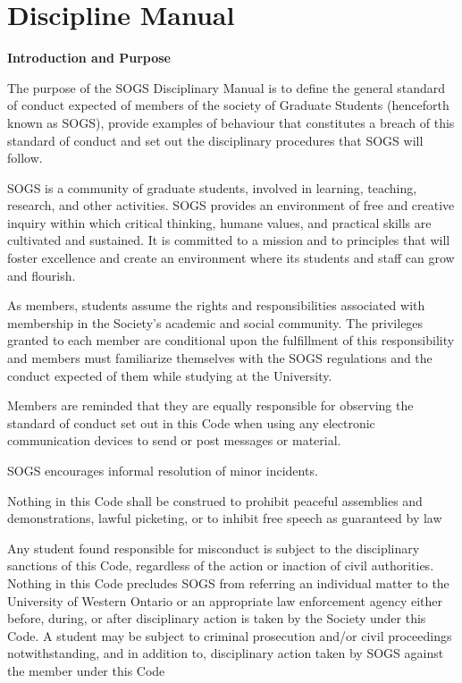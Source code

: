 \section{Discipline Manual}

\begin{longenum}[ label*=\arabic*., align=left]
\item  \textbf{Introduction and Purpose}
\begin{longenum}[ label*=\arabic*., align=left]     
\item  The  purpose  of  the  SOGS  Disciplinary  Manual  is  to  define  the  general  standard  of  conduct expected of members of the society of Graduate Students (henceforth known as SOGS), provide examples  of  behaviour  that  constitutes  a  breach  of  this  standard  of  conduct  and  set  out  the disciplinary procedures that SOGS will follow.
     \item SOGS is a community of graduate students, involved in learning, teaching, research, and other activities.  SOGS provides  an  environment  of  free  and  creative  inquiry  within  which  critical thinking,  humane  values,  and  practical  skills  are  cultivated  and  sustained.  It  is  committed  to  a mission and to principles that will foster excellence and create an environment where its students and staff can grow and flourish.
     \item  As  members,  students  assume  the  rights  and  responsibilities  associated  with  membership  in the  Society's  academic  and  social  community.  The  privileges  granted  to  each  member  are conditional  upon  the  fulfillment  of  this  responsibility  and  members  must  familiarize  themselves with the SOGS regulations and the conduct expected of them while studying at the University.
     \item Members are reminded that they are equally responsible for observing the standard of conduct 
set out in this Code when using any electronic communication devices to send or post messages or material.
     \item SOGS encourages informal resolution of minor incidents.
     \item   Nothing  in  this  Code  shall  be  construed  to  prohibit  peaceful  assemblies  and  demonstrations, lawful picketing, or to inhibit free speech as guaranteed by law
     \item Any student found responsible for misconduct is subject to the disciplinary sanctions of this Code,  regardless  of  the  action  or  inaction  of  civil  authorities.  Nothing  in  this  Code  precludes SOGS from referring an individual matter to the University of Western Ontario or an appropriate law enforcement agency either before, during, or after disciplinary action is taken by the Society under  this  Code.  A  student  may  be  subject  to  criminal  prosecution  and/or  civil  proceedings notwithstanding, and in addition to, disciplinary action taken by SOGS against the member under this Code

\end{longenum}
\end{longenum}
